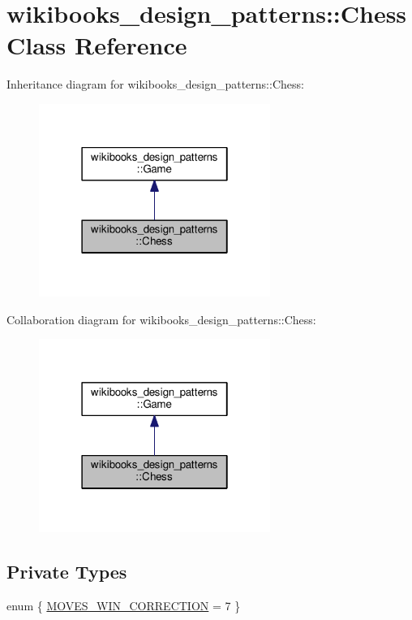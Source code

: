 \hypertarget{classwikibooks__design__patterns_1_1Chess}{}\section{wikibooks\+\_\+design\+\_\+patterns\+:\+:Chess Class Reference}
\label{classwikibooks__design__patterns_1_1Chess}


Inheritance diagram for wikibooks\+\_\+design\+\_\+patterns\+:\+:Chess\+:
\nopagebreak
\begin{figure}[H]
\begin{center}
\leavevmode
\includegraphics[width=214pt]{classwikibooks__design__patterns_1_1Chess__inherit__graph}
\end{center}
\end{figure}


Collaboration diagram for wikibooks\+\_\+design\+\_\+patterns\+:\+:Chess\+:
\nopagebreak
\begin{figure}[H]
\begin{center}
\leavevmode
\includegraphics[width=214pt]{classwikibooks__design__patterns_1_1Chess__coll__graph}
\end{center}
\end{figure}
\subsection*{Private Types}
\begin{DoxyCompactItemize}
\item 
enum \{ \hyperlink{classwikibooks__design__patterns_1_1Chess_a4dd06f0e46a019fabaa0d06013eda2ecaf2a5dc2ad13559326bb03ee0772d95c0}{M\+O\+V\+E\+S\+\_\+\+W\+I\+N\+\_\+\+C\+O\+R\+R\+E\+C\+T\+I\+ON} = 7
 \}
\end{DoxyCompactItemize}
